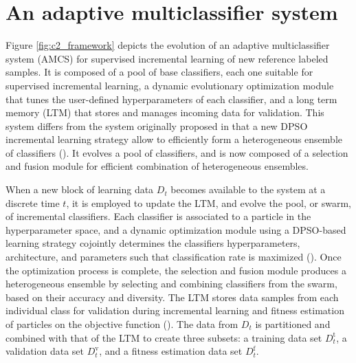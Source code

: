 \section{An adaptive multiclassifier system}
\label{sec:c2_adaptation}

\begin{figure*}[t]
  \centering
  \caption{Evolution over time of the adaptive multiclassifier system (AMCS) in a generic incremental learning scenario, where new blocks of data are used to update a swarm of classifiers.
Let $D_1$, $D_2$, ... be blocks of learning data that become available at different labeled instants in time $t=1,2,...,T$.
The AMCS starts with an initial hypothesis $hyp_0$ according to prior knowledge of the domain.
Each hypothesis $hyp_{t-1}$ are updated to $hyp_{t}$ by the AMCS on the basis of a new data blocks $D_t$}
	\label{fig:c2_framework}
\end{figure*}

Figure \ref{fig:c2_framework} depicts the evolution of an adaptive multiclassifier system (AMCS) for supervised incremental learning of new reference labeled samples.
It is composed of a pool of base classifiers, each one suitable for supervised incremental learning, a dynamic evolutionary optimization module that tunes the user-defined hyperparameters of each classifier, and a long term memory (LTM) that stores and manages incoming data for validation.
This system differs from the system originally proposed in that a new DPSO incremental learning strategy allow to efficiently form a heterogeneous ensemble of classifiers (\cite{connolly10}).
It evolves a pool of classifiers, and is now composed of a selection and fusion module for efficient combination of heterogeneous ensembles.

When a new block of learning data $D_t$ becomes available to the system at a discrete time $t$, it is employed to update the LTM, and evolve the pool, or swarm, of incremental classifiers.
Each classifier is associated to a particle in the hyperparameter space, and a dynamic optimization module using a DPSO-based learning strategy cojointly determines the classifiers hyperparameters, architecture, and parameters such that classification rate is maximized (\cite{connolly10_2}).
Once the optimization process is complete, the selection and fusion module produces a heterogeneous ensemble by selecting and combining classifiers from the swarm, based on their accuracy and diversity.
The LTM stores data samples from each individual class for validation during incremental learning and fitness estimation of particles on the objective function (\cite{connolly10}).
The data from $D_t$ is partitioned and combined with that of the LTM to create three subsets: a training data set $D_t^\text{t}$, a validation data set $D_t^\text{v}$, and a fitness estimation data set $D_t^\text{f}$. 

